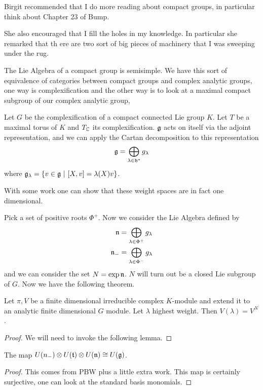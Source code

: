 \documentclass[12pt]{article}
\begin{document}
Birgit recommended that I do more reading about compact groups, in particular think about Chapter 23 of Bump.

She also encouraged that I fill the holes in my knowledge. In particular she remarked that th
ere are two sort of big pieces of machinery
that I was sweeping under the rug.

The Lie Algebra of a compact group is semisimple.
We have this sort of equivalence of categories between compact groups and complex analytic groups, one way is complexification and the other way
is to look at a maximal compact subgroup of our complex analytic group, 

Let $G$ be the complexification of a compact connected Lie group $K$. Let $T$ be a maximal torus of $K$ and $T_{\mathbb{C}}$ its complexification.
$\mathfrak{g}$ acts on itself via the adjoint representation, and we can apply the Cartan decomposition to this representation \begin{align*}
    \mathfrak{g} = \bigoplus_{\lambda\in\mathfrak{h}^*}g_\lambda
\end{align*} where $\mathfrak{g}_\lambda = \{v\in \mathfrak{g}\ \vert \  [X,v] = \lambda(X)v\}$.

With some work one can show that these weight spaces are in fact one dimensional.

Pick a set of positive roots $\Phi^+$. Now we consider the Lie Algebra defined by \begin{align*}
    \mathfrak{n} &= \bigoplus_{\lambda\in\Phi^+} g_\lambda \\
    \mathfrak{n}_- &= \bigoplus_{\lambda\in\Phi^-} g_\lambda
\end{align*} and we can consider the set $N = \exp\mathfrak{n}$. $N$ will turn out be a closed Lie
subgroup of $G$. Now we have the following theorem.
\begin{theorem}
Let $\pi,V$ be a finite dimensional irreducible complex $K$-module and extend
it to an analytic finite dimensional $G$ module. Let $\lambda$ highest weight.
Then $V(\lambda) = V^N$.
\end{theorem}
\begin{proof}
    We will need to invoke the following lemma.
\end{proof}

\begin{lemma}
    The map $U(n_-)\otimes U(\mathfrak{t})\otimes U(\mathfrak{n}) \cong U(\mathfrak{g})$.
\end{lemma}
\begin{proof}
    This comes from PBW plus a little extra work. This map is certainly surjective, 
    one can look at the standard basis monomials.
\end{proof}
\end{document}
